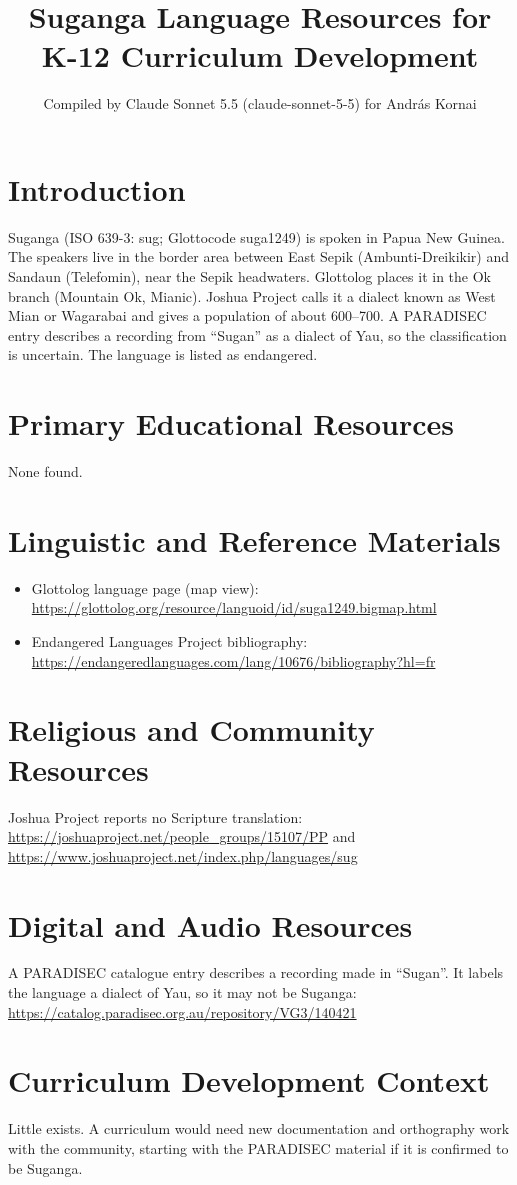 \documentclass[12pt]{article}
\title{Suganga Language Resources for K-12 Curriculum Development}
\author{Compiled by Claude Sonnet 5.5 (claude-sonnet-5-5) for Andr\'as Kornai}
\date{}
\begin{document}
\maketitle

\section{Introduction}
Suganga (ISO 639-3: sug; Glottocode suga1249) is spoken in Papua New Guinea. The speakers live in the border area between East Sepik (Ambunti-Dreikikir) and Sandaun (Telefomin), near the Sepik headwaters. Glottolog places it in the Ok branch (Mountain Ok, Mianic). Joshua Project calls it a dialect known as West Mian or Wagarabai and gives a population of about 600--700. A PARADISEC entry describes a recording from ``Sugan'' as a dialect of Yau, so the classification is uncertain. The language is listed as endangered.

\section{Primary Educational Resources}
None found.

\section{Linguistic and Reference Materials}
\begin{itemize}
\item Glottolog language page (map view): \url{https://glottolog.org/resource/languoid/id/suga1249.bigmap.html}
\item Endangered Languages Project bibliography: \url{https://endangeredlanguages.com/lang/10676/bibliography?hl=fr}
\end{itemize}

\section{Religious and Community Resources}
Joshua Project reports no Scripture translation: \url{https://joshuaproject.net/people_groups/15107/PP} and \url{https://www.joshuaproject.net/index.php/languages/sug}

\section{Digital and Audio Resources}
A PARADISEC catalogue entry describes a recording made in ``Sugan''. It labels the language a dialect of Yau, so it may not be Suganga: \url{https://catalog.paradisec.org.au/repository/VG3/140421}

\section{Curriculum Development Context}
Little exists. A curriculum would need new documentation and orthography work with the community, starting with the PARADISEC material if it is confirmed to be Suganga.
\end{document}
